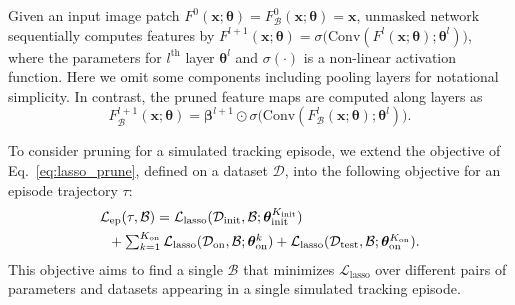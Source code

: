 \documentclass[letterpaper]{article} %
\def \x{\mathbf{x}}
\def \datainit{\mathcal{D}_\text{init}}
\def \dataonline{\mathcal{D}_\text{on}}
\def \dataval{\mathcal{D}_\text{test}}
\def \thetageneral{\boldsymbol{\theta}}
\def \thetainitadapt{\boldsymbol{\theta}_\text{init}}
\def \thetaonlineadapt{\boldsymbol{\theta}_\text{on}}
\def \Kinit{K_\text{init}}
\def \Konline{K_\text{on}}
\def \losslasso{\mathcal{L}_\text{lasso}}
\def \lossepisode{\mathcal{L}_\text{ep}}
\begin{document}
Given an input image patch $F^0(\x;\thetageneral)=F^0_{\mathcal{B}}(\x;\thetageneral) = \x$, unmasked network sequentially computes features by $F^{l+1}(\x; \boldsymbol{\theta})=\sigma\big(\text{Conv}(F^{l}(\x; \boldsymbol{\theta}); \boldsymbol{\theta}^l ) \big)$, where the parameters for $l^\text{th}$ layer $\boldsymbol{\theta}^l$ and $\sigma(\cdot)$ is a non-linear activation function. 
Here we omit some components including pooling layers for notational simplicity. 
In contrast, the pruned feature maps are computed along layers as 
\begin{equation}
F^{l+1}_\mathcal{B}(\x ; \boldsymbol{\theta}) = \boldsymbol{\beta}^{l+1} \odot \sigma\big( \text{Conv} (F^l_\mathcal{B}(\x ; \boldsymbol{\theta}); \boldsymbol{\theta}^l)  \big). 
\end{equation}




To consider pruning for a simulated tracking episode, we extend the objective of Eq.~\eqref{eq:lasso_prune}, defined on a dataset $\mathcal{D}$, into the following objective for an episode trajectory $\tau$:  
\begin{equation}
\begin{split}
& \textstyle \lossepisode(\tau, \mathcal{B})
	 = \losslasso(\datainit, \mathcal{B}; \thetainitadapt^{\Kinit}) \\
& \textstyle \hspace{0.2cm}
	+ \sum_{k=1}^{\Konline}\losslasso(\dataonline, \mathcal{B};\thetaonlineadapt^k)
	+ \losslasso(\dataval, \mathcal{B};\thetaonlineadapt^{\Konline}). 
\label{eq:lasso_prune_episode}
\end{split}
\end{equation}
This objective aims to find a single $\mathcal{B}$ that minimizes $\losslasso$ over different pairs of parameters and datasets appearing in a single simulated tracking episode.
\end{document}
